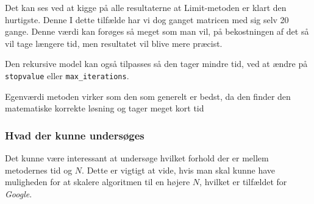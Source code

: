 Det kan ses ved at kigge på alle resultaterne at Limit-metoden er klart den hurtigste. Denne I dette tilfælde har vi dog ganget matricen med sig selv 20 gange. Denne værdi kan forøges så meget som man vil, på bekostningen af det så vil tage længere tid, men resultatet vil blive mere præcist.

Den rekursive model kan også tilpasses så den tager mindre tid, ved at ændre på \texttt{stopvalue} eller \texttt{max\_iterations}.

Egenværdi metoden virker som den som generelt er bedst, da den finder den matematiske korrekte løsning og tager meget kort tid

\subsubsection*{Hvad der kunne undersøges}
Det kunne være interessant at undersøge hvilket forhold der er mellem metodernes tid og $N$. Dette er vigtigt at vide, hvis man skal kunne have muligheden for at skalere algoritmen til en højere $N$, hvilket er tilfældet for \emph{Google}.

